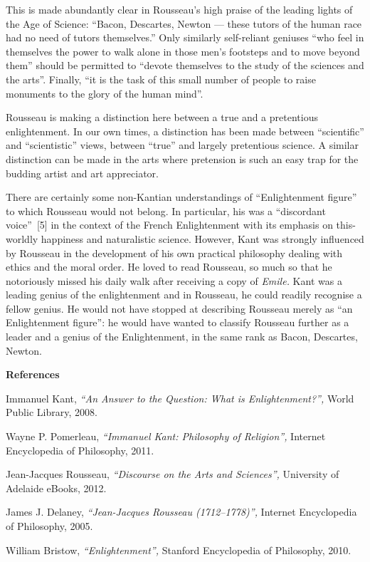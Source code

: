\begin{multicols}{2}
This is made abundantly clear in Rousseau’s high praise of the leading lights of the Age of Science: ``Bacon, Descartes, Newton
--- these tutors of the human race had no need of tutors themselves.'' Only similarly self-reliant geniuses ``who feel in
themselves the power to walk alone in those men's footsteps and to move beyond them'' should be permitted to ``devote
themselves to the study of the sciences and the arts''. Finally, ``it is the task of this small number of people to raise monuments
to the glory of the human mind''.

Rousseau is making a distinction here between a true and a pretentious enlightenment. In our own times, a distinction has
been made between ``scientific'' and ``scientistic'' views, between ``true'' and largely pretentious science. A similar distinction
can be made in the arts where pretension is such an easy trap for the budding artist and art appreciator.

There are certainly some non-Kantian understandings of ``Enlightenment figure'' to which Rousseau would not belong. In
particular, his was a ``discordant voice''~[5] in the context of the French Enlightenment with its emphasis on this-worldly
happiness and naturalistic science. However, Kant was strongly influenced by Rousseau in the development of his own
practical philosophy dealing with ethics and the moral order. He loved to read Rousseau, so much so that he notoriously
missed his daily walk after receiving a copy of \emph{Emile.} Kant was a leading genius of the enlightenment and in Rousseau, he
could readily recognise a fellow genius. He would not have stopped at describing Rousseau merely as ``an Enlightenment
figure'': he would have wanted to classify Rousseau further as a leader and a genius of the Enlightenment, in the same rank as
Bacon, Descartes, Newton.

\bigskip

\noindent\textbf{\large References}

\begin{enumerate}[{[1]}]
\item Immanuel Kant, \emph{“An Answer to the Question: What is Enlightenment?”,} World Public Library, 2008.
\item Wayne P. Pomerleau, \emph{“Immanuel Kant: Philosophy of Religion”,} Internet Encyclopedia of Philosophy, 2011.
\item Jean-Jacques Rousseau, \emph{``Discourse on the Arts and Sciences'',} University of Adelaide eBooks, 2012.
\item James J. Delaney, \emph{``Jean-Jacques Rousseau (1712--1778)'',} Internet Encyclopedia of Philosophy, 2005.
\item William Bristow, \emph{“Enlightenment”,} Stanford Encyclopedia of Philosophy, 2010.
\end{enumerate}
\end{multicols}
